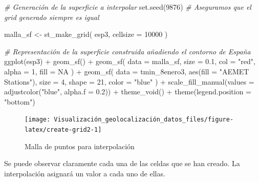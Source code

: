 \documentclass[
]{book}
\newenvironment{Shaded}{\begin{snugshade}}{\end{snugshade}}
\newcommand{\AttributeTok}[1]{\textcolor[rgb]{0.77,0.63,0.00}{#1}}
\newcommand{\CommentTok}[1]{\textcolor[rgb]{0.56,0.35,0.01}{\textit{#1}}}
\newcommand{\ConstantTok}[1]{\textcolor[rgb]{0.00,0.00,0.00}{#1}}
\newcommand{\DecValTok}[1]{\textcolor[rgb]{0.00,0.00,0.81}{#1}}
\newcommand{\FloatTok}[1]{\textcolor[rgb]{0.00,0.00,0.81}{#1}}
\newcommand{\FunctionTok}[1]{\textcolor[rgb]{0.00,0.00,0.00}{#1}}
\newcommand{\NormalTok}[1]{#1}
\newcommand{\OtherTok}[1]{\textcolor[rgb]{0.56,0.35,0.01}{#1}}
\newcommand{\SpecialCharTok}[1]{\textcolor[rgb]{0.00,0.00,0.00}{#1}}
\newcommand{\StringTok}[1]{\textcolor[rgb]{0.31,0.60,0.02}{#1}}
\theoremstyle{definition}
\theoremstyle{definition}
\theoremstyle{definition}
\theoremstyle{definition}
\theoremstyle{remark}
\begin{document}
\begin{Shaded}
\begin{Highlighting}[]

\CommentTok{\# Generación de la superficie a interpolar}
\FunctionTok{set.seed}\NormalTok{(}\DecValTok{9876}\NormalTok{) }\CommentTok{\# Aseguramos que el grid generado siempre es igual}

\NormalTok{malla\_sf }\OtherTok{\textless{}{-}} \FunctionTok{st\_make\_grid}\NormalTok{(}
\NormalTok{  esp3,}
  \AttributeTok{cellsize =} \DecValTok{10000}
\NormalTok{)}

\CommentTok{\# Representación de la superficie construida añadiendo el contorno de España}
\FunctionTok{ggplot}\NormalTok{(esp3) }\SpecialCharTok{+}
  \FunctionTok{geom\_sf}\NormalTok{() }\SpecialCharTok{+}
  \FunctionTok{geom\_sf}\NormalTok{(}
    \AttributeTok{data =}\NormalTok{ malla\_sf,}
    \AttributeTok{size =} \FloatTok{0.1}\NormalTok{,}
    \AttributeTok{col =} \StringTok{"red"}\NormalTok{, }\AttributeTok{alpha =} \DecValTok{1}\NormalTok{,}
    \AttributeTok{fill =} \ConstantTok{NA}
\NormalTok{  ) }\SpecialCharTok{+}
  \FunctionTok{geom\_sf}\NormalTok{(}
    \AttributeTok{data =}\NormalTok{ tmin\_8enero3,}
    \FunctionTok{aes}\NormalTok{(}\AttributeTok{fill =} \StringTok{"AEMET Stations"}\NormalTok{), }\AttributeTok{size =} \DecValTok{4}\NormalTok{, }\AttributeTok{shape =} \DecValTok{21}\NormalTok{,}
    \AttributeTok{color =} \StringTok{"blue"}
\NormalTok{  ) }\SpecialCharTok{+}
  \FunctionTok{scale\_fill\_manual}\NormalTok{(}\AttributeTok{values =} \FunctionTok{adjustcolor}\NormalTok{(}\StringTok{"blue"}\NormalTok{, }\AttributeTok{alpha.f =} \FloatTok{0.2}\NormalTok{)) }\SpecialCharTok{+}
  \FunctionTok{theme\_void}\NormalTok{() }\SpecialCharTok{+}
  \FunctionTok{theme}\NormalTok{(}\AttributeTok{legend.position =} \StringTok{"bottom"}\NormalTok{)}
\end{Highlighting}
\end{Shaded}

\begin{figure}

{\centering \texttt{[image: Visualización\_geolocalización\_datos\_files/figure-latex/create-grid2-1]} 

}

\caption{Malla de puntos para interpolación}\label{fig:create-grid2}
\end{figure}

Se puede observar claramente cada una de las celdas que se han creado. La
interpolación asignará un valor a cada uno de ellas.
\end{document}
